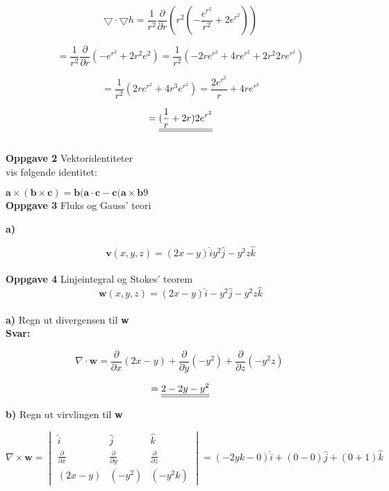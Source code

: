 \documentclass[a4paper,norsk,12pt]{article}
\begin{document}
$$
\bigtriangledown \cdot \bigtriangledown h = \frac{1}{r^2} \frac{\partial}{\partial r} (r^2 (- \frac{e^{r^2}}{r^2} + 2 e^{r^2}))
$$

$$
= \frac{1}{r^2} \frac{\partial}{\partial r} (-e^{r^2} +2 r^2 e^2) = \frac{1}{r^2} (-2re^{r^2} + 4 r e^{r^2} + 2r^2 2re^{r^2})
$$

$$
=\frac{1}{r^2} (2re^{r^2} + 4r^3 e^{r^2}) = \frac{2 e^{r^2}}{r} + 4re^{r^2}
$$

$$
\def\doubleunderline#1{\underline{\underline{#1}}}
=\doubleunderline{(\frac{1}{r} + 2r)2e^{r^2}}
$$\\


\textbf{Oppgave 2} \hspace{3mm}  Vektoridentiteter \\

vis følgende identitet:

$ \textbf{a} \times (\textbf{b} \times \textbf{c} ) = \textbf{b}(\textbf{a} \cdot \textbf{c} - \textbf{c}(\textbf{a} \times \textbf{b}9 $\\


\textbf{Oppgave 3} \hspace{3mm} Fluks og Gauss' teori

\textbf{a)} 

$$ \textbf{v}(x,y,z) = (2x - y) \hat i y^2 \hat j - y^2 z \hat k $$\\


\textbf{Oppgave 4} \hspace{3mm} Linjeintegral og Stokes' teorem\\

$$ \textbf{w} (x,y,z) = (2x - y) \hat i -y^2 \hat j - y^2 z \hat k $$
\\
\textbf{a)} Regn ut divergensen til \textbf{w}
\\

\textbf{Svar:}

$$
\nabla \cdot \textbf{w} = \frac{\partial}{\partial x} (2x-y) + \frac{\partial}{\partial y} (-y^2)+ \frac{\partial}{\partial z} (-y^2 z) \ 
$$

$$
\def\doubleunderline#1{\underline{\underline{#1}}}
= \doubleunderline{2 - 2y - y^2}
$$

\textbf{b)} Regn ut virvlingen til \textbf{w}


$$
\nabla \times \textbf{w}
=\begin{vmatrix}
\hat i & \hat j & \hat k \\
\frac{\partial}{\partial x} & \frac{\partial}{\partial y} & \frac{\partial}{\partial z} \\
(2x-y) & (-y^2) & (-y^2 k)
\end{vmatrix}
= (-2 y k - 0) \hat i + (0 - 0) \hat j + (0+1) \hat k
$$
\end{document}
